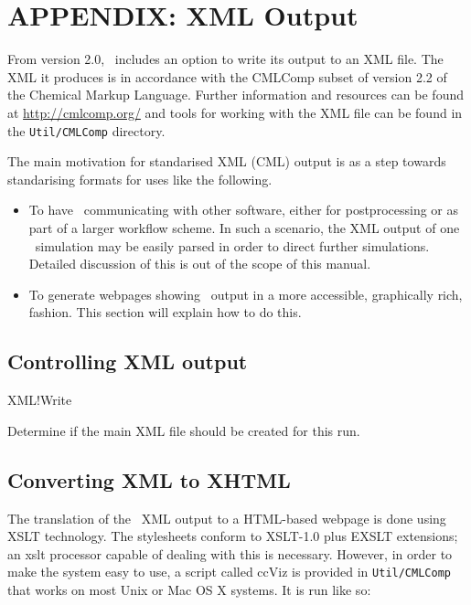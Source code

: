 \newpage
\section{APPENDIX: XML Output}

From version 2.0, \siesta\ includes an option to write its output to an
XML file. The XML it produces is in accordance with the CMLComp subset of
version 2.2 of the Chemical Markup Language. Further information
and resources can be found at \url{http://cmlcomp.org/} and tools for working
with the XML file can be found in the \texttt{Util/CMLComp} directory.

The main motivation for standarised XML (CML) output is as a step
towards standarising formats for uses like the following.

\begin{itemize}

\item To have \siesta\ communicating with other software, either
for postprocessing or as part of a larger workflow scheme. In such a
scenario, the XML output of one \siesta\ simulation may be easily parsed
in order to direct further simulations. Detailed discussion of this is
out of the scope of this manual.

\item To generate webpages showing \siesta\ output in a more accessible,
graphically rich, fashion. This section will explain how to do this.

\end{itemize}

\subsection{Controlling XML output}

\begin{fdflogicalF}{XML!Write}

  Determine if the main XML file should be created for this run.
  
\end{fdflogicalF}

\subsection{Converting XML to XHTML}

The translation of the \siesta\ XML output to a HTML-based webpage is
done using XSLT technology. The stylesheets conform to XSLT-1.0 plus
EXSLT extensions; an xslt processor capable of dealing with this is
necessary. However, in order to make the system easy to use, a script
called ccViz is provided in \texttt{Util/CMLComp} that works on most Unix or
Mac OS X systems. It is run like so:


